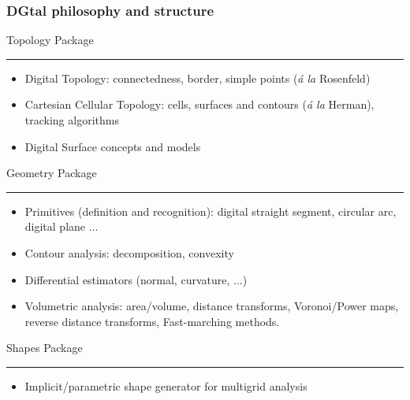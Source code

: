 \documentclass[8pt]{beamer}
\newcommand{\HH}{ \vspace{0.5pt}\hrule}
\begin{document}
\begin{frame}
  \frametitle{DGtal philosophy and structure}
  \begin{alertblock}{\centering Topology Package\HH}
    \small
       \begin{itemize}
    \item Digital Topology: connectedness, border, simple points
      (\emph{\'a la} Rosenfeld)
    \item Cartesian Cellular Topology: cells,  surfaces and contours
      (\emph{\'a la} Herman), tracking algorithms
    \item Digital Surface concepts and models
    \end{itemize}
  \end{alertblock}
    \begin{alertblock}{\centering Geometry Package\HH}
    \small
    \begin{itemize}
    \item Primitives (definition and recognition): digital straight segment,
      circular arc, digital plane ...
    \item Contour analysis: decomposition, convexity
    \item Differential estimators (normal, curvature, ...)
    \item Volumetric analysis: area/volume, distance transforms,
      Voronoi/Power maps,      reverse distance transforms, Fast-marching methods.
 \end{itemize}
  \end{alertblock}
    \begin{alertblock}{\centering Shapes Package\HH}
    \small
    \begin{itemize}
    \item Implicit/parametric shape generator for multigrid analysis
    \end{itemize}
  \end{alertblock}

\end{frame}
\end{document}
